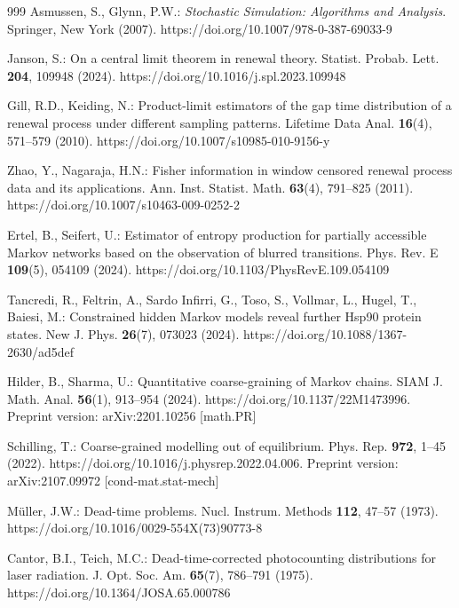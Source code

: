 \begin{thebibliography}{999}
Asmussen, S., Glynn, P.W.: \emph{Stochastic Simulation: Algorithms and Analysis}. Springer, New York (2007). https://doi.org/10.1007/978-0-387-69033-9

Janson, S.: On a central limit theorem in renewal theory. Statist. Probab. Lett. \textbf{204}, 109948 (2024). https://doi.org/10.1016/j.spl.2023.109948

Gill, R.D., Keiding, N.: Product-limit estimators of the gap time distribution
of a renewal process under different sampling patterns. Lifetime Data Anal.
\textbf{16}(4), 571--579 (2010).
https://doi.org/10.1007/s10985-010-9156-y

Zhao, Y., Nagaraja, H.N.: Fisher information in window censored renewal
process data and its applications. Ann. Inst. Statist. Math. \textbf{63}(4),
791--825 (2011). https://doi.org/10.1007/s10463-009-0252-2

Ertel, B., Seifert, U.: Estimator of entropy production for partially accessible Markov networks based on the observation of blurred transitions. Phys. Rev. E \textbf{109}(5), 054109 (2024). https://doi.org/10.1103/PhysRevE.109.054109

Tancredi, R., Feltrin, A., Sardo Infirri, G., Toso, S., Vollmar, L., Hugel, T., Baiesi, M.: Constrained hidden Markov models reveal further Hsp90 protein states. New J. Phys. \textbf{26}(7), 073023 (2024). https://doi.org/10.1088/1367-2630/ad5def

Hilder, B., Sharma, U.: Quantitative coarse-graining of Markov chains. SIAM J. Math. Anal. \textbf{56}(1), 913--954 (2024). https://doi.org/10.1137/22M1473996. Preprint version: arXiv:2201.10256 [math.PR]

Schilling, T.: Coarse-grained modelling out of equilibrium. Phys. Rep. \textbf{972}, 1--45 (2022). https://doi.org/10.1016/j.physrep.2022.04.006. Preprint version: arXiv:2107.09972 [cond-mat.stat-mech]

M\"uller, J.W.: Dead-time problems. Nucl. Instrum. Methods \textbf{112}, 47--57 (1973). https://doi.org/10.1016/0029-554X(73)90773-8

Cantor, B.I., Teich, M.C.: Dead-time-corrected photocounting distributions for laser radiation. J. Opt. Soc. Am. \textbf{65}(7), 786--791 (1975). https://doi.org/10.1364/JOSA.65.000786


\end{thebibliography}
